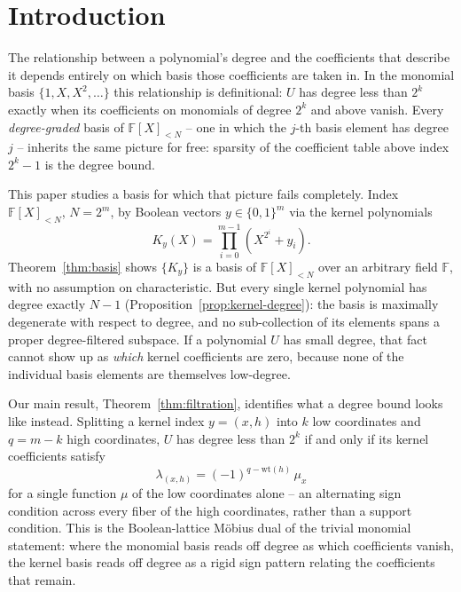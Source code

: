 \documentclass[preprint,3p,12pt,numbers]{elsarticle}
\theoremstyle{definition}
\theoremstyle{remark}
\newcommand{\wt}{\mathrm{wt}}
\begin{document}
\begingroup
  \setcounter{tocdepth}{2}
  \small
  \tableofcontents
\endgroup
\medskip

\section{Introduction}
\label{sec:intro}

The relationship between a polynomial's degree and the coefficients that
describe it depends entirely on which basis those coefficients are taken
in. In the monomial basis $\{1,X,X^2,\dots\}$ this relationship is
definitional: $U$ has degree less than $2^k$ exactly when its coefficients
on monomials of degree $2^k$ and above vanish. Every \emph{degree-graded}
basis of $\mathbb{F}[X]_{<N}$ -- one in which the $j$-th basis element has
degree $j$ -- inherits the same picture for free: sparsity of the
coefficient table above index $2^k-1$ is the degree bound.

This paper studies a basis for which that picture fails completely. Index
$\mathbb{F}[X]_{<N}$, $N=2^m$, by Boolean vectors $y \in \{0,1\}^m$ via the
kernel polynomials
\[
  K_y(X) = \prod_{i=0}^{m-1} \left(X^{2^i}+y_i\right) .
\]
Theorem~\ref{thm:basis} shows $\{K_y\}$ is a basis of $\mathbb{F}[X]_{<N}$
over an arbitrary field $\mathbb{F}$, with no assumption on characteristic.
But every single kernel polynomial has degree exactly $N-1$
(Proposition~\ref{prop:kernel-degree}): the basis is maximally degenerate
with respect to degree, and no sub-collection of its elements spans a
proper degree-filtered subspace. If a polynomial $U$ has small degree,
that fact cannot show up as \emph{which} kernel coefficients are zero,
because none of the individual basis elements are themselves low-degree.

Our main result, Theorem~\ref{thm:filtration}, identifies what a degree
bound looks like instead. Splitting a kernel index $y=(x,h)$ into $k$ low
coordinates and $q=m-k$ high coordinates, $U$ has degree less than $2^k$
if and only if its kernel coefficients satisfy
\[
  \lambda_{(x,h)} = (-1)^{q-\wt(h)}\, \mu_x
\]
for a single function $\mu$ of the low coordinates alone -- an alternating
sign condition across every fiber of the high coordinates, rather than a
support condition. This is the Boolean-lattice M\"obius dual of the
trivial monomial statement: where the monomial basis reads off degree as
which coefficients vanish, the kernel basis reads off degree as a rigid
sign pattern relating the coefficients that remain.
\end{document}

